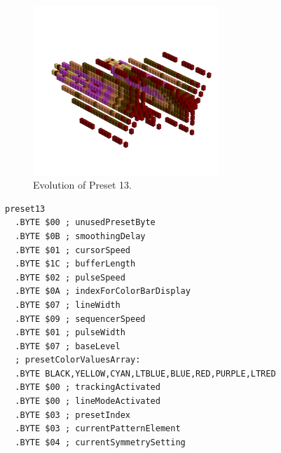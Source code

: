 \clearpage
\vspace*{-0.5cm}
\begin{minipage}[b]{0.48\linewidth}


                                                                 
\begin{figure}[H]                                                          
  \centering                                                             
  \begin{adjustbox}{width=7cm,center}                                   
  \includegraphics[width=7cm]{src/presets/pattern13-45.png}%
  \end{adjustbox}                                                        
\caption{Evolution of Preset 13.}                                           
\end{figure}                                                               
                                                                 
                                                                           
\end{minipage}
\hspace{0.1cm}
\begin{minipage}[b]{0.48\linewidth}                                       
\begin{lstlisting}[basicstyle=\ttfamily\scriptsize,caption=Data structure for Preset 13.]
preset13
  .BYTE $00 ; unusedPresetByte
  .BYTE $0B ; smoothingDelay
  .BYTE $01 ; cursorSpeed
  .BYTE $1C ; bufferLength
  .BYTE $02 ; pulseSpeed
  .BYTE $0A ; indexForColorBarDisplay
  .BYTE $07 ; lineWidth
  .BYTE $09 ; sequencerSpeed
  .BYTE $01 ; pulseWidth
  .BYTE $07 ; baseLevel
  ; presetColorValuesArray: 
  .BYTE BLACK,YELLOW,CYAN,LTBLUE,BLUE,RED,PURPLE,LTRED
  .BYTE $00 ; trackingActivated
  .BYTE $00 ; lineModeActivated
  .BYTE $03 ; presetIndex
  .BYTE $03 ; currentPatternElement
  .BYTE $04 ; currentSymmetrySetting
\end{lstlisting}
\end{minipage}

